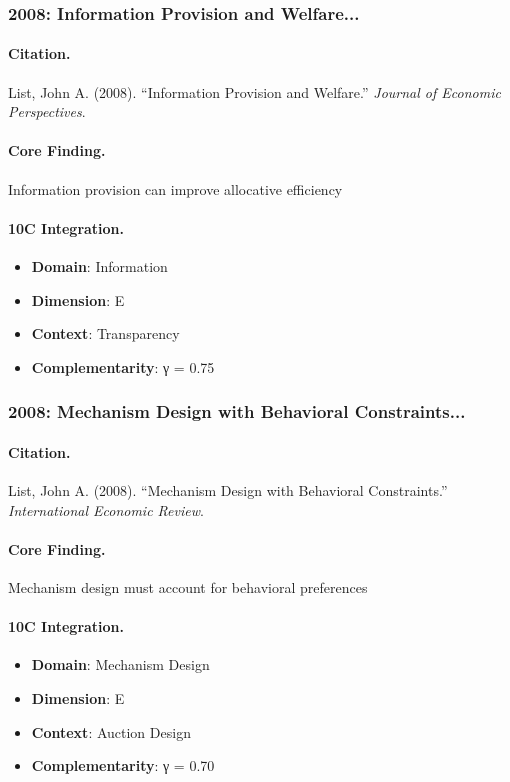 \subsubsection{2008: Information Provision and Welfare...}

\paragraph{Citation.}
List, John A. (2008). ``Information Provision and Welfare.''
\textit{Journal of Economic Perspectives}.

\paragraph{Core Finding.}
Information provision can improve allocative efficiency

\paragraph{10C Integration.}
\begin{itemize}[nosep]
  \item \textbf{Domain}: Information
  \item \textbf{Dimension}: E
  \item \textbf{Context}: Transparency
  \item \textbf{Complementarity}: γ = 0.75
\end{itemize}


\subsubsection{2008: Mechanism Design with Behavioral Constraints...}

\paragraph{Citation.}
List, John A. (2008). ``Mechanism Design with Behavioral Constraints.''
\textit{International Economic Review}.

\paragraph{Core Finding.}
Mechanism design must account for behavioral preferences

\paragraph{10C Integration.}
\begin{itemize}[nosep]
  \item \textbf{Domain}: Mechanism Design
  \item \textbf{Dimension}: E
  \item \textbf{Context}: Auction Design
  \item \textbf{Complementarity}: γ = 0.70
\end{itemize}


